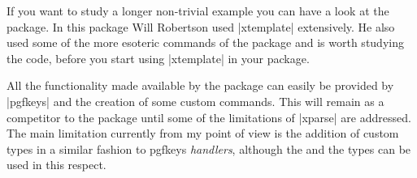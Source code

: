 If you want to study a longer non-trivial example you can have a look at the  package. In this package Will Robertson used |xtemplate| extensively. He also used some of the more esoteric commands of the package and is worth studying the code, before you start using |xtemplate| in your package.

All the functionality made available by the package can easily be provided by |pgfkeys| and the creation of some custom commands. This will remain as a competitor to the package until some of the limitations of |xparse| are addressed. The main limitation currently from my point of view is the addition of custom types  in a similar fashion to pgfkeys \emph{handlers}, although the  and the  types can be used in this respect.



